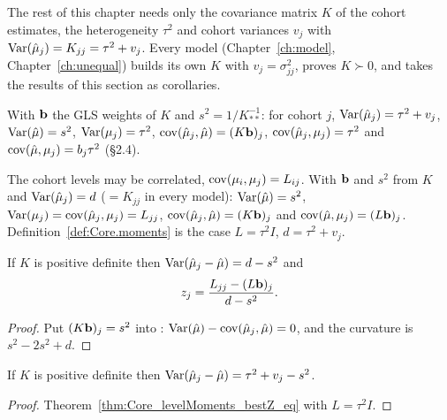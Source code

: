 The rest of this chapter needs only the covariance matrix $K$ of the cohort
estimates, the heterogeneity $\tau^2$ and cohort variances $v_j$ with
$\operatorname{Var}(\hat\mu_j) = K_{jj} = \tau^2 + v_j$. Every model (Chapter~\ref{ch:model},
Chapter~\ref{ch:unequal}) builds its own $K$ with $v_j = \sigma^2_{jj}$, proves
$K \succ 0$, and takes the results of this section as corollaries.

\begin{definition}\label{def:Core.moments}
  \leanok
  With $\mathbf{b}$ the GLS weights of $K$ and $s^2 = 1/K^{-1}_{**}$: for cohort $j$,
  $\operatorname{Var}(\hat\mu_j) = \tau^2 + v_j$, $\operatorname{Var}(\hat\mu) = s^2$, $\operatorname{Var}(\mu_j) = \tau^2$,
  $\operatorname{cov}(\hat\mu_j, \hat\mu) = (K\mathbf{b})_j$, $\operatorname{cov}(\hat\mu_j, \mu_j) = \tau^2$ and
  $\operatorname{cov}(\hat\mu, \mu_j) = b_j\tau^2$ (§2.4).
\end{definition}

\begin{definition}\label{def:Core.levelMoments}
  \leanok
  The cohort levels may be correlated, $\operatorname{cov}(\mu_i,\mu_j) = L_{ij}$. With $\mathbf{b}$
  and $s^2$ from $K$ and $\operatorname{Var}(\hat\mu_j) = d$ ($= K_{jj}$ in every model):
  $\operatorname{Var}(\hat\mu) = s^2$, $\operatorname{Var}(\mu_j) = \operatorname{cov}(\hat\mu_j,\mu_j) = L_{jj}$,
  $\operatorname{cov}(\hat\mu_j,\hat\mu) = (K\mathbf{b})_j$ and $\operatorname{cov}(\hat\mu,\mu_j) = (L\mathbf{b})_j$.
  Definition~\ref{def:Core.moments} is the case $L = \tau^2 I$,
  $d = \tau^2 + v_j$.
\end{definition}

\begin{theorem}\label{thm:Core_levelMoments_bestZ_eq}
  \leanok
  If $K$ is positive definite then $\operatorname{Var}(\hat\mu_j - \hat\mu) = d - s^2$ and
  \[
    z_j = \frac{L_{jj} - (L\mathbf{b})_j}{d - s^2}.
  \]
\end{theorem}
\begin{proof}
  \leanok
  Put $(K\mathbf{b})_j = s^2$ into : $\operatorname{Var}(\hat\mu) - \operatorname{cov}(\hat\mu_j,\hat\mu) = 0$, and
  the curvature is $s^2 - 2s^2 + d$.
\end{proof}

\begin{lemma}\label{lem:Core_gap_eq}
  \leanok
  If $K$ is positive definite then $\operatorname{Var}(\hat\mu_j - \hat\mu) = \tau^2 + v_j - s^2$.
\end{lemma}
\begin{proof}
  \leanok
  Theorem~\ref{thm:Core_levelMoments_bestZ_eq} with $L = \tau^2 I$.
\end{proof}

